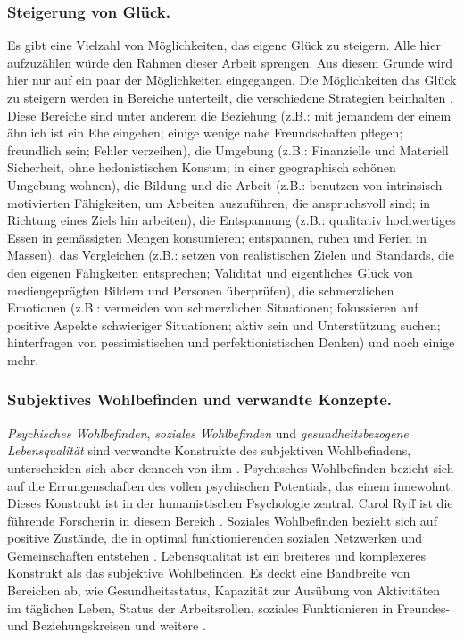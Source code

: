 \subsubsection{Steigerung von Glück.} Es gibt eine Vielzahl von Möglichkeiten, das eigene Glück zu steigern. Alle hier aufzuzählen würde den Rahmen dieser Arbeit sprengen. Aus diesem Grunde wird hier nur auf ein paar der Möglichkeiten eingegangen. Die Möglichkeiten das Glück zu steigern werden in Bereiche unterteilt, die verschiedene Strategien beinhalten \cite{Carr2011}. Diese Bereiche sind unter anderem die Beziehung (z.B.: mit jemandem der einem ähnlich ist ein Ehe eingehen; einige wenige nahe Freundschaften pflegen; freundlich sein; Fehler verzeihen), die Umgebung (z.B.: Finanzielle und Materiell Sicherheit, ohne hedonistischen Konsum; in einer geographisch schönen Umgebung wohnen), die Bildung und die Arbeit (z.B.: benutzen von intrinsisch motivierten Fähigkeiten, um Arbeiten auszuführen, die anspruchsvoll sind; in Richtung eines Ziels hin arbeiten), die Entspannung (z.B.: qualitativ hochwertiges Essen in gemässigten Mengen konsumieren; entspannen, ruhen und Ferien in Massen), das Vergleichen (z.B.: setzen von realistischen Zielen und Standards, die den eigenen Fähigkeiten entsprechen; Validität und eigentliches Glück von mediengeprägten Bildern und Personen überprüfen), die schmerzlichen Emotionen (z.B.: vermeiden von schmerzlichen Situationen; fokussieren auf positive Aspekte schwieriger Situationen; aktiv sein und Unterstützung suchen; hinterfragen von pessimistischen und perfektionistischen Denken) und noch einige mehr.

\subsubsection{Subjektives Wohlbefinden und verwandte Konzepte.} \textit{Psychisches Wohlbefinden}, \textit{soziales Wohlbefinden} und \textit{gesundheitsbezogene Lebensqualität} sind verwandte Konstrukte des subjektiven Wohlbefindens, unterscheiden sich aber dennoch von ihm \cite{Carr2011}. Psychisches Wohlbefinden bezieht sich auf die Errungenschaften des vollen psychischen Potentials, das einem innewohnt. Dieses Konstrukt ist in der humanistischen Psychologie zentral. Carol Ryff ist die führende Forscherin in diesem Bereich \cite{Ryff1989}. Soziales Wohlbefinden bezieht sich auf positive Zustände, die in optimal funktionierenden sozialen Netzwerken und Gemeinschaften entstehen \cite{Keyes1998}. Lebensqualität ist ein breiteres und komplexeres Konstrukt als das subjektive Wohlbefinden. Es deckt eine Bandbreite von Bereichen ab, wie Gesundheitsstatus, Kapazität zur Ausübung von Aktivitäten im täglichen Leben, Status der Arbeitsrollen, soziales Funktionieren in Freundes- und Beziehungskreisen und weitere \cite{Preedy2010}. 

